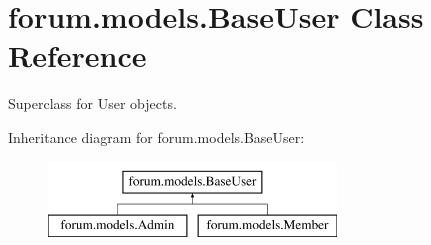 \hypertarget{classforum_1_1models_1_1_base_user}{}\section{forum.\+models.\+Base\+User Class Reference}
\label{classforum_1_1models_1_1_base_user}


Superclass for User objects.  


Inheritance diagram for forum.\+models.\+Base\+User\+:\begin{figure}[H]
\begin{center}
\leavevmode
\includegraphics[height=2.000000cm]{classforum_1_1models_1_1_base_user}
\end{center}
\end{figure}
